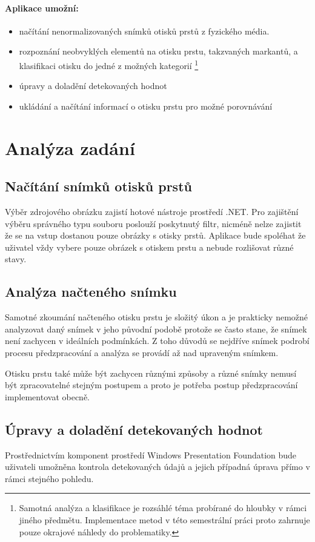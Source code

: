 \documentclass[12pt,a4paper]{article}
\let\oldsection\section
\renewcommand\section{\clearpage\oldsection}
\begin{document}
\paragraph{Aplikace umožní:}
\begin{itemize}
\item načítání nenormalizovaných snímků otisků prstů z fyzického média.
\item rozpoznání neobvyklých elementů na otisku prstu, takzvaných markantů, a klasifikaci otisku do jedné z možných kategorií \footnote{Samotná analýza a klasifikace je rozsáhlé téma probírané do hloubky v rámci jiného předmětu. Implementace metod v této semestrální práci proto zahrnuje pouze okrajové náhledy do problematiky.}
\item úpravy a doladění detekovaných hodnot
\item ukládání a načítání informací o otisku prstu pro možné porovnávání
\end{itemize}

\section{Analýza zadání}
\subsection{Načítání snímků otisků prstů}
Výběr zdrojového obrázku zajistí hotové nástroje prostředí .NET. Pro zajištění výběru správného typu souboru poslouží poskytnutý filtr, nicméně nelze zajistit že se na vstup dostanou pouze obrázky s otisky prstů. Aplikace bude spoléhat že uživatel vždy vybere pouze obrázek s otiskem prstu a nebude rozlišovat různé stavy.
\subsection{Analýza načteného snímku}
Samotné zkoumání načteného otisku prstu je složitý úkon a je prakticky nemožné analyzovat daný snímek v jeho původní podobě protože se často stane, že snímek není zachycen v ideálních podmínkách. Z toho důvodů se nejdříve snímek podrobí procesu předzpracování a analýza se provádí až nad upraveným snímkem.
\par
Otisku prstu také může být zachycen různými způsoby a různé snímky nemusí být zpracovatelné stejným postupem a proto je potřeba postup předzpracování implementovat obecně.
\subsection{Úpravy a doladění detekovaných hodnot}
Prostřednictvím komponent prostředí Windows Presentation Foundation bude uživateli umožněna kontrola detekovaných údajů a jejich případná úprava přímo v rámci stejného pohledu.
\end{document}
